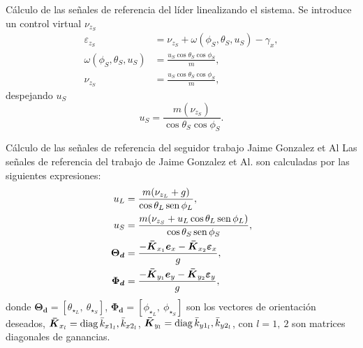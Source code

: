 \documentclass[hyperref={pdfpagelabels=false}]{beamer}
\begin{document}
\begin{frame}{Cálculo de las señales de referencia del l\'ider linealizando el sistema.} 
	Se introduce un control virtual $\nu_{z_S}$
	\begin{equation}
		\begin{split}
			\varepsilon_{z_S} &= \nu_{z_S} + \omega(\phi_S,\theta_S,u_S)- \gamma_x,\\
			\omega(\phi_S,\theta_S,u_S) &= \frac{u_S \cos{\theta_S}\cos{\phi_S}}{m},\\
			\nu_{z_S} &= \frac{u_S \cos{\theta_S}\cos{\phi_S}}{m},
		\end{split}
	\end{equation}
	despejando $u_S$
	\begin{equation}
		u_S = \frac{m (\nu_{z_S})}{\cos{\theta_S}\cos{\phi_S}}.
	\end{equation}
\end{frame}

\begin{frame}{Cálculo de las señales de referencia del seguidor trabajo Jaime Gonzalez et Al} 
Las se\~nales de referencia del trabajo de Jaime Gonzalez et Al. son calculadas por las siguientes expresiones:
\begin{equation}
	\begin{split}
		u_L &= \frac{m(\nu_{z_L}+g)}{\cos{\theta_{L}}\operatorname{sen}{\phi_L}},\\
		u_S &= \frac{m(\nu_{z_S}+u_L\cos{\theta_{L}}\operatorname{sen}{\phi_L})}{\cos{\theta_{S}}\operatorname{sen}{\phi_S}},\\
		\boldsymbol{\Theta_d} &= \frac{-\boldsymbol{\bar{K}}_{x_1}\boldsymbol{e}_x - \boldsymbol{\bar{K}}_{x_2}\boldsymbol{\varepsilon}_x}{g},\\
		\boldsymbol{\Phi_d} &= \frac{-\boldsymbol{\bar{K}}_{y_1}\boldsymbol{e}_y - \boldsymbol{\bar{K}}_{y_2}\boldsymbol{\varepsilon}_y}{g},\\	
	\end{split}
\end{equation}
donde $\boldsymbol{\Theta_d} = [\theta_{\star_L},~\theta_{\star_S}]$, $\boldsymbol{\Phi_d} = [\phi_{\star_L},~ \phi_{\star_S}]$ son los vectores de orientación deseados, $\boldsymbol{\bar{K}}_{x_l} = \operatorname{diag}{\bar{k}_{x1_l},\bar{k}_{x2_l}}$,  $\boldsymbol{\bar{K}}_{y_l} = \operatorname{diag}{\bar{k}_{y1_l},\bar{k}_{y2_l}}$, con $l = 1,~2$ son matrices diagonales de ganancias.
	
\end{frame}
\end{document}
